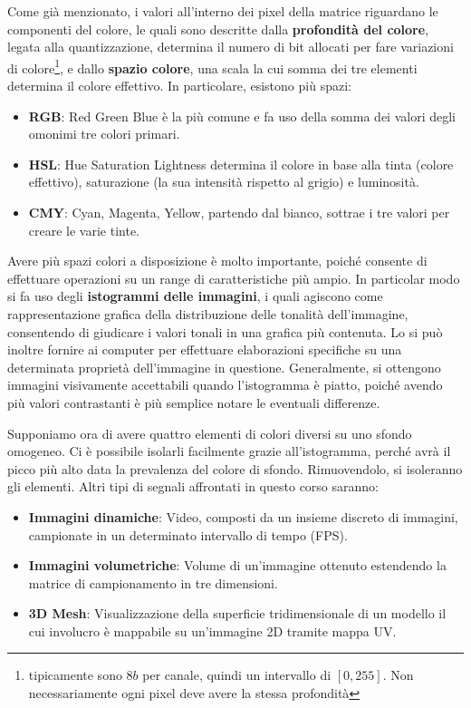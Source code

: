 \noindent Come già menzionato, i valori all'interno dei pixel della matrice riguardano le componenti del colore, le quali sono descritte dalla \textbf{
profondità del colore}, legata alla quantizzazione, determina il numero di bit allocati per fare variazioni di colore\footnote{tipicamente sono $8b$ per
canale, quindi un intervallo di $[0, 255]$. Non necessariamente ogni pixel deve avere la stessa profondità}, e dallo \textbf{spazio colore}, una scala
la cui somma dei tre elementi determina il colore effettivo. In particolare, esistono più spazi: \begin{itemize}
	\item \textbf{RGB}: Red Green Blue è la più comune e fa uso della somma dei valori degli omonimi tre colori primari.
	\item \textbf{HSL}: Hue Saturation Lightness determina il colore in base alla tinta (colore effettivo), saturazione (la sua intensità rispetto al
	grigio) e luminosità.
	\item \textbf{CMY}: Cyan, Magenta, Yellow, partendo dal bianco, sottrae i tre valori per creare le varie tinte.
\end{itemize}

\noindent Avere più spazi colori a disposizione è molto importante, poiché consente di effettuare operazioni su un range di caratteristiche più ampio.
In particolar modo si fa uso degli \textbf{istogrammi delle immagini}, i quali agiscono come rappresentazione grafica della distribuzione delle tonalità
dell'immagine, consentendo di giudicare i valori tonali in una grafica più contenuta. Lo si può inoltre fornire ai computer per effettuare elaborazioni
specifiche su una determinata proprietà dell'immagine in questione. Generalmente, si ottengono immagini visivamente accettabili quando l'istogramma è
piatto, poiché avendo più valori contrastanti è più semplice notare le eventuali differenze.\par
Supponiamo ora di avere quattro elementi di colori diversi su uno sfondo omogeneo. Ci è possibile isolarli facilmente grazie all'istogramma, perché avrà
il picco più alto data la prevalenza del colore di sfondo. Rimuovendolo, si isoleranno gli elementi. Altri tipi di segnali affrontati in questo corso
saranno: \begin{itemize}
	\item \textbf{Immagini dinamiche}: Video, composti da un insieme discreto di immagini, campionate in un determinato intervallo di tempo (FPS).
	\item \textbf{Immagini volumetriche}: Volume di un'immagine ottenuto estendendo	la matrice di campionamento in tre dimensioni.
	\item \textbf{3D Mesh}: Visualizzazione della superficie tridimensionale di un modello il cui involucro è mappabile su un'immagine 2D tramite mappa
	UV.
\end{itemize}

